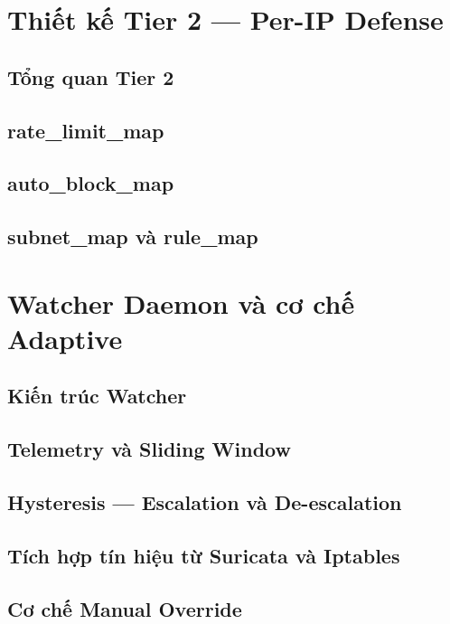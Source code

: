\documentclass[../DoAn.tex]{subfiles}
\begin{document}
\section{Thiết kế Tier 2 — Per-IP Defense}

\subsection{Tổng quan Tier 2}

\subsection{rate\_limit\_map}

\subsection{auto\_block\_map}

\subsection{subnet\_map và rule\_map}

\section{Watcher Daemon và cơ chế Adaptive}

\subsection{Kiến trúc Watcher}

\subsection{Telemetry và Sliding Window}

\subsection{Hysteresis — Escalation và De-escalation}

\subsection{Tích hợp tín hiệu từ Suricata và Iptables}

\subsection{Cơ chế Manual Override}
\end{document}
